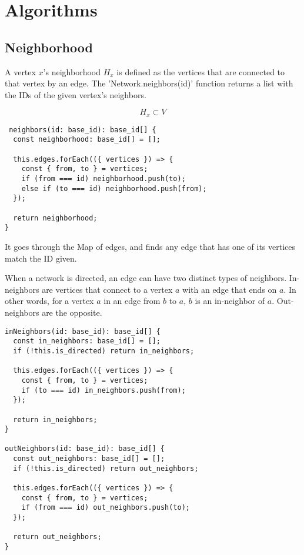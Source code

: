 \chapter{Algorithms}

\section{Neighborhood}
A vertex $x$'s neighborhood $H_x$ is defined as the vertices that are connected to that vertex by an edge.
The 'Network.neighbors(id)' function returns a list with the IDs of the given vertex's neighbors.

$$H_x\subset V$$

\begin{verbatim}
 neighbors(id: base_id): base_id[] {
  const neighborhood: base_id[] = [];

  this.edges.forEach(({ vertices }) => {
    const { from, to } = vertices;
    if (from === id) neighborhood.push(to);
    else if (to === id) neighborhood.push(from);
  });

  return neighborhood;
}
\end{verbatim}

It goes through the Map of edges, and finds any edge that has one of its vertices match the ID given.

When a network is directed, an edge can have two distinct types of neighbors.
In-neighbors are vertices that connect to a vertex $a$ with an edge that ends on $a$.
In other words, for a vertex $a$ in an edge from $b$ to $a$, $b$ is an in-neighbor of $a$.
Out-neighbors are the opposite.

\begin{verbatim}
inNeighbors(id: base_id): base_id[] {
  const in_neighbors: base_id[] = [];
  if (!this.is_directed) return in_neighbors;

  this.edges.forEach(({ vertices }) => {
    const { from, to } = vertices;
    if (to === id) in_neighbors.push(from);
  });

  return in_neighbors;
}

outNeighbors(id: base_id): base_id[] {
  const out_neighbors: base_id[] = [];
  if (!this.is_directed) return out_neighbors;

  this.edges.forEach(({ vertices }) => {
    const { from, to } = vertices;
    if (from === id) out_neighbors.push(to);
  });

  return out_neighbors;
}
\end{verbatim}


